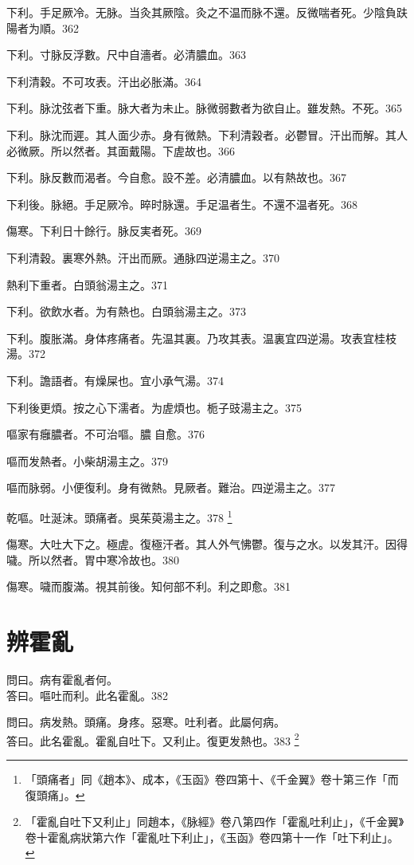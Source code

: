 下利。手足厥{\khaai 冷}。无脉。{\khaai 当灸其厥陰。}灸之不温{\khaai 而脉不還}。反微喘者死。少陰負趺陽者为順。362

下利。寸脉反浮數。尺中自濇者。必清膿血。363

下利清穀。不可攻表。汗出必胀滿。364

下利。脉沈弦者下重。脉大者为未止。脉微弱數者为欲自止。雖发熱。不死。365

下利。脉沈而遲。其人面少赤。身有微熱。下利清穀者。必鬱冒。汗出而解。其人必微厥。所以然者。其面戴陽。下虗故也。366

下利。脉反數而渴者。今自愈。設不差。必清膿血。以有熱故也。367

下利後。脉絕。手足厥{\khaai 冷}。晬时脉還。手足温者生。不還{\khaai 不温}者死。368

傷寒。下利日十餘行。脉反実者死。369

下利清穀。裏寒外熱。汗出而厥。通脉四逆湯主之。370

熱利下重者。白頭翁湯主之。371

下利。欲飲水者。为有熱也。白頭翁湯主之。373

下利。腹{\khaai 胀}滿。身体疼痛者。先温其裏。乃攻其表。温裏宜四逆湯。攻表宜桂枝湯。372

下利。譫語者。有燥屎也。宜{\khaai 小}承气湯。374

下利後更煩。按之心下濡者。为虗煩也。栀子{\khaai 豉}湯主之。375

嘔家有癰膿者。不可治嘔。膿{\sungii 𥁞}自愈。376

嘔而发熱者。小柴胡湯主之。379

嘔而脉弱。小便復利。身有微熱。見厥者。難治。四逆湯主之。377

乾嘔。吐涎沫。頭痛者。吳茱萸湯主之。378
	\footnote{
		「頭痛者」同《趙本》、成本，《玉函》卷四第十、《千金翼》卷十第三作「而復頭痛」。
	}

傷寒。大吐大下之。極虗。復極汗者。其人外气怫鬱。復与之水。以发其汗。因得噦。所以然者。胃中寒冷故也。380

傷寒。噦而腹滿。視其前後。知何部不利。利之即愈。381

\chapter{辨霍亂}

問曰。病有霍亂者何。\\
答曰。嘔吐而利。此名霍亂。382

問曰。病发熱。頭痛。身疼。惡寒。吐利者。此屬何病。\\
答曰。此名霍亂。霍亂自吐下。又利止。復更发熱也。383
	\footnote{
		「霍亂自吐下又利止」同趙本，《脉經》卷八第四作「霍亂吐利止」，《千金翼》卷十霍亂病狀第六作「霍亂吐下利止」，《玉函》卷四第十一作「吐下利止」。
	}

